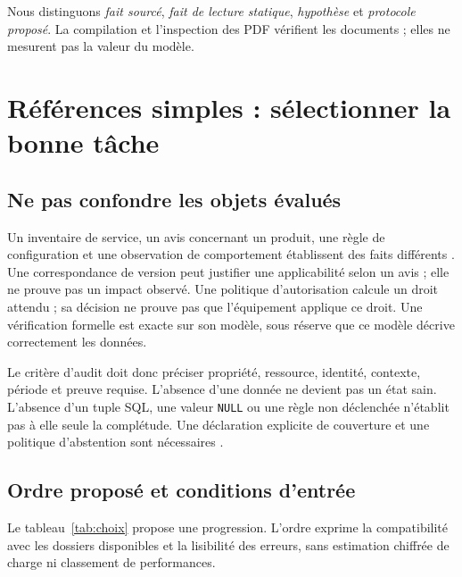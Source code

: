 \documentclass[11pt,a4paper]{article}
\newcommand{\code}[1]{\nolinkurl{#1}}
\begin{document}
Nous distinguons \emph{fait sourcé}, \emph{fait de lecture statique},
\emph{hypothèse} et \emph{protocole proposé}. La compilation et l'inspection
des PDF vérifient les documents ; elles ne mesurent pas la valeur du modèle.

\section{Références simples : sélectionner la bonne tâche}
\subsection{Ne pas confondre les objets évalués}
Un inventaire de service, un avis concernant un produit, une règle de
configuration et une observation de comportement établissent des faits
différents \cite{outils}. Une correspondance de version peut justifier une
applicabilité selon un avis ; elle ne prouve pas un impact observé. Une
politique d'autorisation calcule un droit attendu ; sa décision ne prouve pas
que l'équipement applique ce droit. Une vérification formelle est exacte sur
son modèle, sous réserve que ce modèle décrive correctement les données.

Le critère d'audit doit donc préciser propriété, ressource, identité, contexte,
période et preuve requise. L'absence d'une donnée ne devient pas un état sain.
L'absence d'un tuple SQL, une valeur \code{NULL} ou une règle non déclenchée
n'établit pas à elle seule la complétude. Une déclaration explicite de couverture
et une politique d'abstention sont nécessaires \cite{raisonnement}.

\subsection{Ordre proposé et conditions d'entrée}
Le tableau~\ref{tab:choix} propose une progression. L'ordre exprime la
compatibilité avec les dossiers disponibles et la lisibilité des erreurs,
sans estimation chiffrée de charge ni classement de performances.
\end{document}
